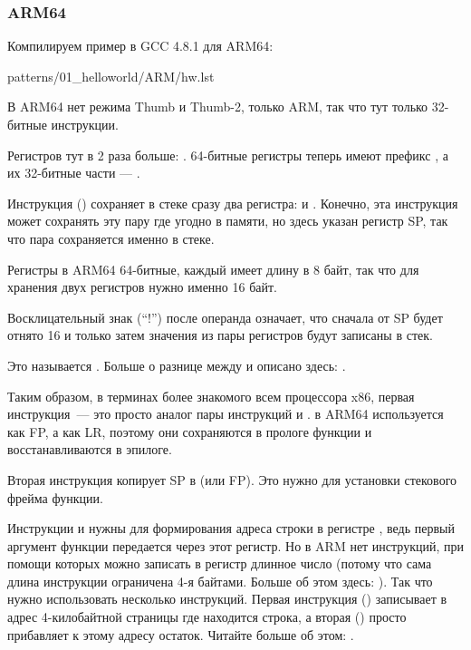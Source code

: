 \subsubsection{ARM64}


Компилируем пример в GCC 4.8.1 для ARM64:


{patterns/01_helloworld/ARM/hw.lst}

В ARM64 нет режима Thumb и Thumb-2, только ARM, так что тут только 32-битные инструкции.

Регистров тут в 2 раза больше: .
64-битные регистры теперь имеют префикс 
, а их 32-битные части --- .

Инструкция  () 
сохраняет в стеке сразу два регистра:  и .
Конечно, эта инструкция может сохранять эту пару где угодно в памяти, но здесь указан регистр \ac{SP}, так что
пара сохраняется именно в стеке.

Регистры в ARM64 64-битные, каждый имеет длину в 8 байт, так что для хранения двух регистров нужно именно 16 байт.

Восклицательный знак (``!'') после операнда означает, что сначала от \ac{SP} будет отнято 16 и только затем
значения из пары регистров будут записаны в стек.

Это называется .
Больше о разнице между  и  
описано здесь: .

Таким образом, в терминах более знакомого всем процессора x86, первая инструкция~--- это просто аналог 
пары инструкций  и .
 в ARM64 используется как \ac{FP}, а  
как \ac{LR}, поэтому они сохраняются в прологе функции и
восстанавливаются в эпилоге.

Вторая инструкция копирует \ac{SP} в  (или \ac{FP}).
Это нужно для установки стекового фрейма функции.

\label{pointers_ADRP_and_ADD}
Инструкции  и \ADD нужны для формирования адреса строки  в регистре , 
ведь первый аргумент функции передается через этот регистр.
Но в ARM нет инструкций, при помощи которых можно записать в регистр длинное число 
(потому что сама длина инструкции ограничена 4-я байтами. Больше об этом здесь: ).
Так что нужно использовать несколько инструкций.
Первая инструкция () записывает в  адрес 4-килобайтной страницы где находится строка, 
а вторая (\ADD) просто прибавляет к этому адресу остаток.
Читайте больше об этом: .

